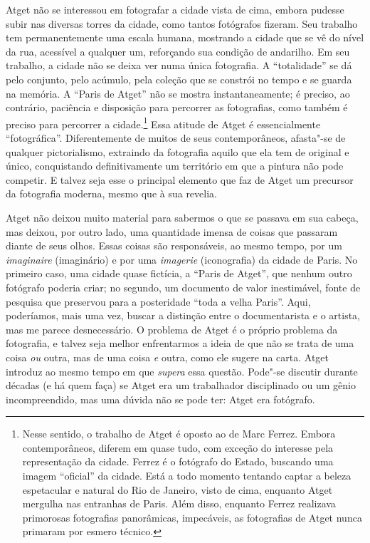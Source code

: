 Atget não se interessou em fotografar a cidade vista de cima, embora
pudesse subir nas diversas torres da cidade, como tantos fotógrafos
fizeram. Seu trabalho tem permanentemente uma escala humana, mostrando a
cidade que se vê do nível da rua, acessível a qualquer um, reforçando
sua condição de andarilho. Em seu trabalho, a cidade não se deixa ver
numa única fotografia. A ``totalidade'' se dá pelo conjunto, pelo
acúmulo, pela coleção que se constrói no tempo e se guarda na memória. A
``Paris de Atget'' não se mostra instantaneamente; é preciso, ao
contrário, paciência e disposição para percorrer as fotografias, como
também é preciso para percorrer a cidade.\footnote{Nesse sentido, o
  trabalho de Atget é oposto ao de Marc Ferrez. Embora contemporâneos,
  diferem em quase tudo, com exceção do interesse pela representação da
  cidade. Ferrez é o fotógrafo do Estado, buscando uma imagem
  ``oficial'' da cidade. Está a todo momento tentando captar a beleza
  espetacular e natural do Rio de Janeiro, visto de cima, enquanto Atget
  mergulha nas entranhas de Paris. Além disso, enquanto Ferrez realizava
  primorosas fotografias panorâmicas, impecáveis, as fotografias de
  Atget nunca primaram por esmero técnico.} Essa atitude de Atget é
essencialmente ``fotográfica''. Diferentemente de muitos de seus
contemporâneos, afasta"-se de qualquer pictorialismo, extraindo da
fotografia aquilo que ela tem de original e único, conquistando
definitivamente um território em que a pintura não pode competir. E
talvez seja esse o principal elemento que faz de Atget um precursor da
fotografia moderna, mesmo que à sua revelia.

Atget não deixou muito material para sabermos o que se passava em sua
cabeça, mas deixou, por outro lado, uma quantidade imensa de coisas que
passaram diante de seus olhos. Essas coisas são responsáveis, ao mesmo
tempo, por um \emph{imaginaire} (imaginário) e por uma \emph{imagerie}
(iconografia) da cidade de Paris. No primeiro caso, uma cidade quase
fictícia, a ``Paris de Atget'', que nenhum outro fotógrafo poderia
criar; no segundo, um documento de valor inestimável, fonte de pesquisa
que preservou para a posteridade ``toda a velha Paris''. Aqui,
poderíamos, mais uma vez, buscar a distinção entre o documentarista e o
artista, mas me parece desnecessário. O problema de Atget é o próprio
problema da fotografia, e talvez seja melhor enfrentarmos a ideia de que
não se trata de uma coisa \emph{ou} outra, mas de uma coisa \emph{e}
outra, como ele sugere na carta. Atget introduz ao mesmo tempo em que
\emph{supera} essa questão. Pode"-se discutir durante décadas (e há quem
faça) se Atget era um trabalhador disciplinado ou um gênio
incompreendido, mas uma dúvida não se pode ter: Atget era fotógrafo.

